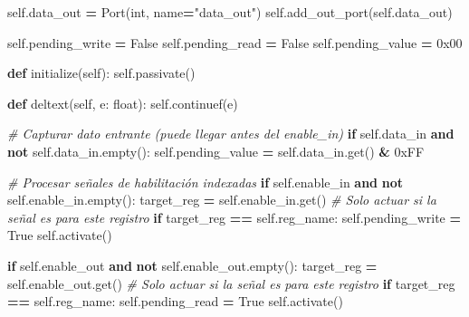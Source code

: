 \documentclass[12pt,oneside]{templates/unerthesis}
\newenvironment{Shaded}{\begin{snugshade}}{\end{snugshade}}
\newcommand{\BaseNTok}[1]{\textcolor[rgb]{0.00,0.00,0.81}{#1}}
\newcommand{\BuiltInTok}[1]{#1}
\newcommand{\CommentTok}[1]{\textcolor[rgb]{0.56,0.35,0.01}{\textit{#1}}}
\newcommand{\ControlFlowTok}[1]{\textcolor[rgb]{0.13,0.29,0.53}{\textbf{#1}}}
\newcommand{\KeywordTok}[1]{\textcolor[rgb]{0.13,0.29,0.53}{\textbf{#1}}}
\newcommand{\NormalTok}[1]{#1}
\newcommand{\OperatorTok}[1]{\textcolor[rgb]{0.81,0.36,0.00}{\textbf{#1}}}
\newcommand{\StringTok}[1]{\textcolor[rgb]{0.31,0.60,0.02}{#1}}
\newcommand{\VariableTok}[1]{\textcolor[rgb]{0.00,0.00,0.00}{#1}}
\begin{document}
\begin{Shaded}
\begin{Highlighting}[]
        \VariableTok{self}\NormalTok{.data\_out }\OperatorTok{=}\NormalTok{ Port(}\BuiltInTok{int}\NormalTok{, name}\OperatorTok{=}\StringTok{"data\_out"}\NormalTok{)}
        \VariableTok{self}\NormalTok{.add\_out\_port(}\VariableTok{self}\NormalTok{.data\_out)}
        
        \VariableTok{self}\NormalTok{.pending\_write }\OperatorTok{=} \VariableTok{False}
        \VariableTok{self}\NormalTok{.pending\_read }\OperatorTok{=} \VariableTok{False}
        \VariableTok{self}\NormalTok{.pending\_value }\OperatorTok{=} \BaseNTok{0x00}
    
    \KeywordTok{def}\NormalTok{ initialize(}\VariableTok{self}\NormalTok{):}
        \VariableTok{self}\NormalTok{.passivate()}
    
    \KeywordTok{def}\NormalTok{ deltext(}\VariableTok{self}\NormalTok{, e: }\BuiltInTok{float}\NormalTok{):}
        \VariableTok{self}\NormalTok{.continuef(e)}
        
        \CommentTok{\# Capturar dato entrante (puede llegar antes del enable\_in)}
        \ControlFlowTok{if} \VariableTok{self}\NormalTok{.data\_in }\KeywordTok{and} \KeywordTok{not} \VariableTok{self}\NormalTok{.data\_in.empty():}
            \VariableTok{self}\NormalTok{.pending\_value }\OperatorTok{=} \VariableTok{self}\NormalTok{.data\_in.get() }\OperatorTok{\&} \BaseNTok{0xFF}
        
        \CommentTok{\# Procesar señales de habilitación indexadas}
        \ControlFlowTok{if} \VariableTok{self}\NormalTok{.enable\_in }\KeywordTok{and} \KeywordTok{not} \VariableTok{self}\NormalTok{.enable\_in.empty():}
\NormalTok{            target\_reg }\OperatorTok{=} \VariableTok{self}\NormalTok{.enable\_in.get()}
            \CommentTok{\# Solo actuar si la señal es para este registro}
            \ControlFlowTok{if}\NormalTok{ target\_reg }\OperatorTok{==} \VariableTok{self}\NormalTok{.reg\_name:}
                \VariableTok{self}\NormalTok{.pending\_write }\OperatorTok{=} \VariableTok{True}
                \VariableTok{self}\NormalTok{.activate()}
        
        \ControlFlowTok{if} \VariableTok{self}\NormalTok{.enable\_out }\KeywordTok{and} \KeywordTok{not} \VariableTok{self}\NormalTok{.enable\_out.empty():}
\NormalTok{            target\_reg }\OperatorTok{=} \VariableTok{self}\NormalTok{.enable\_out.get()}
            \CommentTok{\# Solo actuar si la señal es para este registro}
            \ControlFlowTok{if}\NormalTok{ target\_reg }\OperatorTok{==} \VariableTok{self}\NormalTok{.reg\_name:}
                \VariableTok{self}\NormalTok{.pending\_read }\OperatorTok{=} \VariableTok{True}
                \VariableTok{self}\NormalTok{.activate()}
    

\end{Highlighting}
\end{Shaded}
\end{document}
